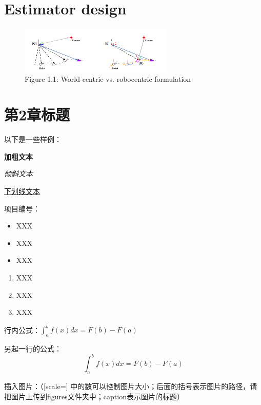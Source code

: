 \documentclass[a4paper, UTF8, fontset=adobe]{ctexart}
\begin{document}
	
\tableofcontents %

\thispagestyle{empty}

\newpage
{}

\section{Estimator design}


\begin{figure}[ht]
\centering
\includegraphics[width=0.65\textwidth]{figures/robocentric formulation illustration.png}
\captionsetup{labelformat=empty}
\caption{Figure 1.1: World-centric vs. robocentric formulation}
\end{figure}

\section{第2章标题}

以下是一些样例：

\textbf{加粗文本}

\textit{倾斜文本}

\underline{下划线文本}

项目编号：

\begin{itemize}
    \item XXX
    \item XXX
    \item XXX
\end{itemize}

\begin{enumerate}
    \item XXX
    \item XXX
    \item XXX
\end{enumerate}

行内公式：$\int_a^b f(x)dx = F(b)-F(a)$

另起一行的公式：
\begin{equation}
    \int_a^b f(x)dx = F(b)-F(a)
\end{equation}

插入图片：（[scale=] 中的数可以控制图片大小；后面的括号表示图片的路径，请把图片上传到figures文件夹中；caption表示图片的标题）
\end{document}
